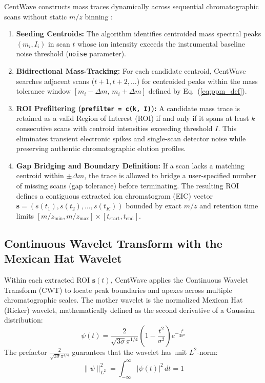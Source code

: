 \documentclass[11pt,twoside,openright]{book}
\begin{document}
CentWave constructs mass traces dynamically across sequential chromatographic scans without static $m/z$ binning \cite{tautenhahn2008highly}:
\begin{enumerate}
    \item \textbf{Seeding Centroids:} The algorithm identifies centroided mass spectral peaks $(m_i, I_i)$ in scan $t$ whose ion intensity exceeds the instrumental baseline noise threshold (\texttt{noise} parameter).
    \item \textbf{Bidirectional Mass-Tracking:} For each candidate centroid, CentWave searches adjacent scans ($t+1, t+2, \dots$) for centroided peaks within the mass tolerance window $[m_i - \Delta m, \, m_i + \Delta m]$ defined by Eq.~(\ref{eq:ppm_def}).
    \item \textbf{ROI Prefiltering (\texttt{prefilter = c(k, I)}):} A candidate mass trace is retained as a valid Region of Interest (ROI) if and only if it spans at least $k$ consecutive scans with centroid intensities exceeding threshold $I$. This eliminates transient electronic spikes and single-scan detector noise while preserving authentic chromatographic elution profiles.
    \item \textbf{Gap Bridging and Boundary Definition:} If a scan lacks a matching centroid within $\pm \Delta m$, the trace is allowed to bridge a user-specified number of missing scans (gap tolerance) before terminating. The resulting ROI defines a contiguous extracted ion chromatogram (EIC) vector $\mathbf{s} = (s(t_1), s(t_2), \dots, s(t_K))$ bounded by exact $m/z$ and retention time limits $[m/z_{\min}, m/z_{\max}] \times [t_{\text{start}}, t_{\text{end}}]$.
\end{enumerate}

\subsection{Continuous Wavelet Transform with the Mexican Hat Wavelet}

Within each extracted ROI $\mathbf{s}(t)$, CentWave applies the Continuous Wavelet Transform (CWT) to locate peak boundaries and apexes across multiple chromatographic scales. The mother wavelet is the normalized Mexican Hat (Ricker) wavelet, mathematically defined as the second derivative of a Gaussian distribution:
\begin{equation}
\label{eq:mexican_hat}
\psi(t) = \frac{2}{\sqrt{3\sigma}\pi^{1/4}} \left( 1 - \frac{t^2}{\sigma^2} \right) e^{-\frac{t^2}{2\sigma^2}}
\end{equation}
The prefactor $\frac{2}{\sqrt{3\sigma}\pi^{1/4}}$ guarantees that the wavelet has unit $L^2$-norm:
\begin{equation}
\|\psi\|_{L^2}^2 = \int_{-\infty}^{\infty} |\psi(t)|^2 \, dt = 1
\end{equation}
\end{document}
